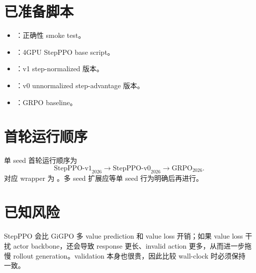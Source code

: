 \documentclass[10pt]{ctexart}
\begin{document}
\section*{已准备脚本}
\begin{itemize}
\item {}：正确性 smoke test。
\item {}：4GPU StepPPO base script。
\item {}：v1 step-normalized 版本。
\item {}：v0 unnormalized step-advantage 版本。
\item {}：GRPO baseline。
\end{itemize}

\section*{首轮运行顺序}
单 seed 首轮运行顺序为
\[
\mathrm{StepPPO\text{-}v1}_{2026}
\rightarrow
\mathrm{StepPPO\text{-}v0}_{2026}
\rightarrow
\mathrm{GRPO}_{2026}.
\]
对应 wrapper 为 。多 seed 扩展应等单 seed 行为明确后再进行。

\section*{已知风险}
StepPPO 会比 GiGPO 多 value prediction 和 value loss 开销；如果 value loss 干扰 actor backbone，还会导致 response 更长、invalid action 更多，从而进一步拖慢 rollout generation。validation 本身也很贵，因此比较 wall-clock 时必须保持  一致。
\end{document}
